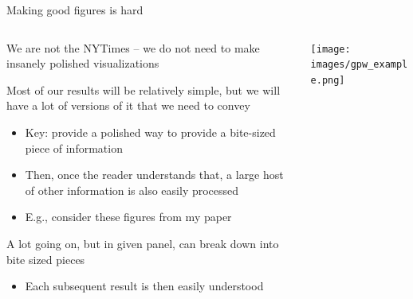 \documentclass[notes,11pt, aspectratio=169]{beamer}
\newcommand\1{\operatorname{\mathbbm{1}}\indicatorfence}
\newenvironment{wideitemize}{\itemize\addtolength{\itemsep}{10pt}}{\enditemize}
\begin{document}
\begin{frame}{Making good figures is hard}
  \begin{columns}[T] %
    \begin{column}{.6\textwidth}
  \begin{wideitemize}
  \item We are not the NYTimes -- we do not need to make insanely polished visualizations
  \item Most of our results will be relatively simple, but we will
    have a lot of versions of it that we need to convey
    \begin{itemize}
    \item Key: provide a polished way to provide a bite-sized piece of information
    \item Then, once the reader understands that, a large host of
      other information is also easily processed
    \item E.g., consider these figures from my paper
    \end{itemize}
  \item A lot going on, but in given panel, can break down into bite
    sized pieces
    \begin{itemize}
    \item Each subsequent result is then easily understood
    \end{itemize}
  \end{wideitemize}
  \end{column}%
  \hfill%
  \begin{column}{.4\textwidth}
    \texttt{[image: images/gpw\_example.png]}
  \end{column}
\end{columns}
\end{frame}
\end{document}
